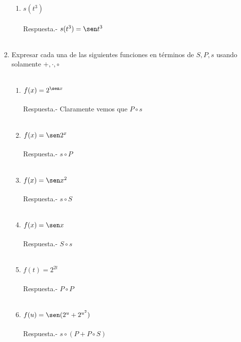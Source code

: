 \begin{enumerate}
\begin{enumerate}[\bfseries (i)]
	    \item $s(t^3)$\\\\
	    Respuesta.- \; $s(t^3)=\sen t^3$\\\\

	\end{enumerate}

	\item Expresar cada una de las siguientes funciones en términos de $S,P,s$ usando solamente $+,\cdot , \circ$\\\\
	\begin{enumerate}[\bfseries (i)]
	    
	    \item $f(x)=2^{\sen x}$\\\\
	    Respuesta.- \; Claramente vemos que $P \circ s$\\\\ 

	    \item $f(x) = \sen 2^x$\\\\
	    Respuesta.- \; $s \circ P$\\\\

	    \item $f(x) = \sen x^2$\\\\
	    Respuesta.- \; $s \circ S$\\\\

	    \item $f(x) = \sen x$\\\\
	    Respuesta.- \; $S \circ s$\\\\

	    \item $f(t) = 2^{2t}$\\\\
	    Respuesta.- \; $P \circ P$\\\\

	    \item $f(u)=\sen (2^u + 2^{u^2})$\\\\
	    Respuesta.- \; $s \circ (P + P \circ S)$\\\\


\end{enumerate}
\end{enumerate}
